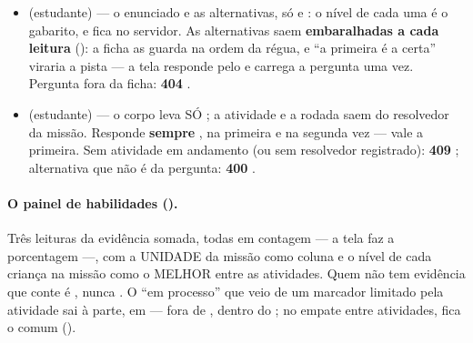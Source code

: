 \begin{itemize}
    as atividades ---  é \enquote{não avaliado} () ---
    e, em cada atividade, o nível de cada habilidade: a melhor rodada, só com o
    que vale, sem a projeção a revisar e sem . Sem origem,
    e sem juntar missões. O professor só abre quem ele ensina
    (); a coordenação regional pode pedir
     de uma escola da regional dela.
  \item {} (estudante) --- o
    enunciado e as alternativas, só  e : o nível de cada uma é
    o gabarito, e fica no servidor. As alternativas saem \textbf{embaralhadas a
    cada leitura} (): a ficha as guarda na ordem da régua, e
    \enquote{a primeira é a certa} viraria a pista --- a tela responde pelo
     e carrega a pergunta uma vez. Pergunta fora da ficha: \textbf{404}
    .
  \item {}
    (estudante) --- o corpo leva SÓ ; a atividade e a rodada
    saem do resolvedor da missão. Responde \textbf{sempre}
    \mbox{}, na primeira e na segunda vez --- vale a primeira.
    Sem atividade em andamento (ou sem resolvedor registrado): \textbf{409}
    ; alternativa que não é da pergunta:
    \textbf{400} .
\end{itemize}

\paragraph{O painel de habilidades ().} Três leituras da
evidência somada, todas em contagem --- a tela faz a porcentagem ---, com a
UNIDADE da missão como coluna e o nível de cada criança na missão como o
MELHOR entre as atividades. Quem não tem evidência que conte é
, nunca . O \enquote{em processo} que veio de
um marcador limitado pela atividade sai à parte, em 
--- fora de , dentro do ; no empate entre
atividades, fica o comum ().

